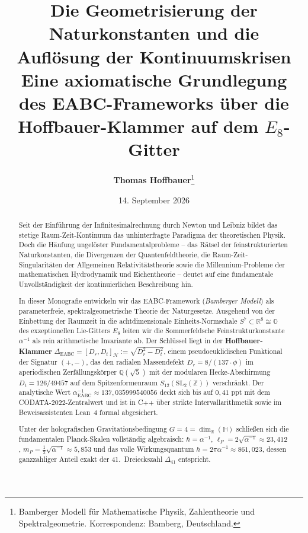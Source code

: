 \documentclass[11pt,a4paper]{article}
\title{\textbf{\LARGE Die Geometrisierung der Naturkonstanten und die Auflösung der Kontinuumskrisen}\\[0.5em]
\Large Eine axiomatische Grundlegung des EABC-Frameworks über die Hoffbauer-Klammer auf dem $E_8$-Gitter}
\author{\textbf{Thomas Hoffbauer}\thanks{Bamberger Modell für Mathematische Physik, Zahlentheorie und Spektralgeometrie. Korrespondenz: Bamberg, Deutschland.}}
\date{14. September 2026}
\theoremstyle{definition}
\theoremstyle{remark}
\numberwithin{equation}{section}
\begin{document}
\maketitle

\begin{abstract}
Seit der Einführung der Infinitesimalrechnung durch Newton und Leibniz bildet das stetige Raum-Zeit-Kontinuum das unhinterfragte Paradigma der theoretischen Physik. Doch die Häufung ungelöster Fundamentalprobleme – das Rätsel der feinstrukturierten Naturkonstanten, die Divergenzen der Quantenfeldtheorie, die Raum-Zeit-Singularitäten der Allgemeinen Relativitätstheorie sowie die Millennium-Probleme der mathematischen Hydrodynamik und Eichentheorie – deutet auf eine fundamentale Unvollständigkeit der kontinuierlichen Beschreibung hin.

In dieser Monografie entwickeln wir das EABC-Framework (\emph{Bamberger Modell}) als parameterfreie, spektralgeometrische Theorie der Naturgesetze. Ausgehend von der Einbettung der Raumzeit in die achtdimensionale Einheits-Normschale $S^7 \subset \mathbb{R}^8 \cong \mathbb{O}$ des exzeptionellen Lie-Gitters $E_8$ leiten wir die Sommerfeldsche Feinstrukturkonstante $\alpha^{-1}$ als rein arithmetische Invariante ab. Der Schlüssel liegt in der \textbf{Hoffbauer-Klammer} $\Delta_{\mathrm{EABC}} = [D_r, D_t]_{\mathcal{H}} := \sqrt{D_r^2 - D_t^2}$, einem pseudoeuklidischen Funktional der Signatur $(+,-)$, das den radialen Massendefekt $D_r = 8 / (137 \cdot \phi)$ im aperiodischen Zerfällungskörper $\mathbb{Q}(\sqrt{5})$ mit der modularen Hecke-Abschirmung $D_t = 126 / 49457$ auf dem Spitzenformenraum $S_{12}(\mathrm{SL}_2(\mathbb{Z}))$ verschränkt. Der analytische Wert $\alpha^{-1}_{\mathrm{EABC}} \approx 137{,}035999540056$ deckt sich bis auf $0{,}41\text{ ppt}$ mit dem CODATA-2022-Zentralwert und ist in C++ über strikte Intervallarithmetik sowie im Beweisassistenten Lean~4 formal abgesichert.

Unter der holografischen Gravitationsbedingung $G = 4 = \dim_{\mathbb{R}}(\mathbb{H})$ schließen sich die fundamentalen Planck-Skalen vollständig algebraisch: $\hbar = \alpha^{-1}$, $\ell_P = 2\sqrt{\alpha^{-1}} \approx 23{,}412$, $m_P = \frac{1}{2}\sqrt{\alpha^{-1}} \approx 5{,}853$ und das volle Wirkungsquantum $h = 2\pi\alpha^{-1} \approx 861{,}023$, dessen ganzzahliger Anteil exakt der 41.~Dreieckszahl $\Delta_{41}$ entspricht. 


\end{abstract}
\end{document}
